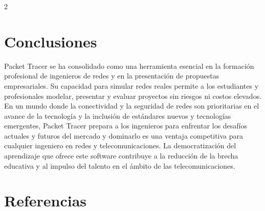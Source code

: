 \documentclass[12pt,spanish,Letterpaper,openany]{book}
\begin{document}
\begin {multicols}{2}
\hypertarget{conclusiones-5}{%
\section{Conclusiones}\label{conclusiones-5}}

Packet Tracer se ha consolidado como una herramienta esencial en la formación profesional
de ingenieros de redes y en la presentación de propuestas empresariales. Su capacidad para
simular redes reales permite a los estudiantes y profesionales modelar, presentar y evaluar
proyectos sin riesgos ni costos elevados. En un mundo donde la conectividad y la seguridad
de redes son prioritarias en el avance de la tecnología y la inclusión de estándares nuevos y
tecnologías emergentes, Packet Tracer prepara a los ingenieros para enfrentar los desafíos actuales y futuros del mercado y dominarlo es una ventaja competitiva para cualquier
ingeniero en redes y telecomunicaciones. La democratización del aprendizaje que ofrece este
software contribuye a la reducción de la brecha educativa y al impulso del talento en el ámbito
de las telecomunicaciones.

\hypertarget{referencias-5}{%
\section{Referencias}\label{referencias-5}}


\end{multicols}
\end{document}
